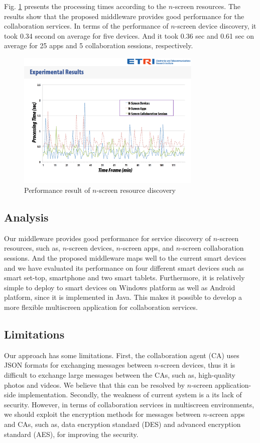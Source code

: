 \documentclass[conference]{IEEEtran}
\begin{document}
Fig. \ref{fig:performance} presents the processing times according to the $n$-screen resources. 
The results show that the proposed middleware provides good performance for the collaboration services. 
In terms of the performance of $n$-screen device discovery, it took 0.34 second on average for five devices. And it took 0.36 sec and 0.61 sec on average for 25 apps and 5 collaboration sessions, respectively.

    \begin{figure}[htb] %
    \centering
    \includegraphics[width=8.8cm,keepaspectratio]{performance}
    \caption{Performance result of $n$-screen resource discovery}
    \label{fig:performance}
    \end{figure}


\subsection{Analysis} 
Our middleware provides good performance for service discovery of $n$-screen resources, such as, $n$-screen devices, $n$-screen apps, and $n$-screen collaboration sessions.
And the proposed middleware maps well to the current smart devices and we have evaluated its performance on four different smart devices such as smart set-top,  smartphone and two smart tablets.
Furthermore, it is relatively simple to deploy to smart devices on Windows platform as well as Android platform, since it is implemented in Java.
This makes it possible to develop a more flexible multiscreen application for collaboration services. 

\subsection{Limitations}
    Our approach has some limitations.
    First, the collaboration agent (CA) uses JSON formats for exchanging messages between $n$-screen devices, thus it is difficult to exchange large messages between the CAs, such as, high-quality photos and videos.  We believe that this can be resolved by $n$-screen application-side implementation.
  Secondly, the weakness of current system is a its lack of security.
  However, in terms of collaboration services in multiscreen environments, we should exploit the encryption methods for messages between $n$-screen apps and CAs, such as, data encryption standard (DES) and advanced encryption standard (AES), for improving the security.
\end{document}
